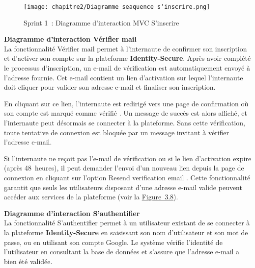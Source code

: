 \begin{figure}[H]
    \centering
    \texttt{[image: chapitre2/Diagramme seaquence s'inscrire.png]}
    \caption{Sprint 1~: Diagramme d'interaction MVC \og S'inscrire \fg{}}
    \label{fig:3.7}
\end{figure}

\medskip

\noindent\textbf{\textendash{} Diagramme d'interaction \og Vérifier mail \fg{}}\\
\hspace{1em}La fonctionnalité \og Vérifier mail \fg{} permet à l'internaute de confirmer son inscription et d'activer son compte sur la plateforme \textbf{Identity-Secure}. Après avoir complété le processus d'inscription, un e-mail de vérification est automatiquement envoyé à l'adresse fournie. Cet e-mail contient un lien d'activation sur lequel l'internaute doit cliquer pour valider son adresse e-mail et finaliser son inscription.

\hspace{1em}En cliquant sur ce lien, l'internaute est redirigé vers une page de confirmation où son compte est marqué comme \og vérifié \fg{}. Un message de succès est alors affiché, et l'internaute peut désormais se connecter à la plateforme. Sans cette vérification, toute tentative de connexion est bloquée par un message invitant à vérifier l'adresse e-mail.

\hspace{1em}Si l'internaute ne reçoit pas l'e-mail de vérification ou si le lien d'activation expire (après 48~heures), il peut demander l'envoi d'un nouveau lien depuis la page de connexion en cliquant sur l'option \og Resend verification email \fg{}. Cette fonctionnalité garantit que seuls les utilisateurs disposant d'une adresse e-mail valide peuvent accéder aux services de la plateforme (voir la \hyperref[fig:3.8]{Figure~3.8}).

\medskip

\noindent\textbf{\textendash{} Diagramme d'interaction \og S'authentifier \fg{}}\\
\hspace{1em}La fonctionnalité \og S'authentifier \fg{} permet à un utilisateur existant de se connecter à la plateforme \textbf{Identity-Secure} en saisissant son nom d'utilisateur et son mot de passe, ou en utilisant son compte Google. Le système vérifie l'identité de l'utilisateur en consultant la base de données et s'assure que l'adresse e-mail a bien été validée.

